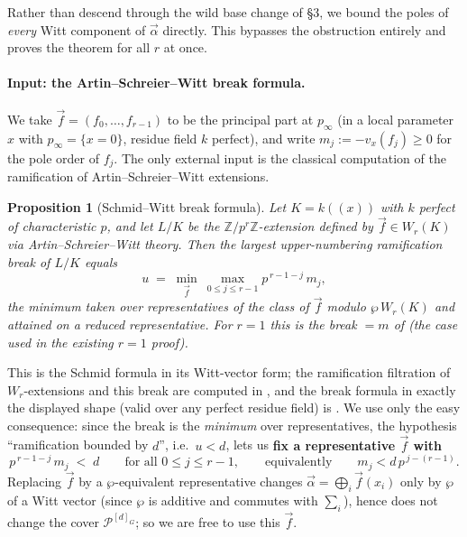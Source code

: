 \documentclass[11pt]{article}
\newcommand{\cP}{\mathcal{P}}
\newcommand{\Z}{\mathbb{Z}}
\newcommand{\AS}{\wp}
\theoremstyle{plain}
\newtheorem{prop}[theorem]{Proposition}
\theoremstyle{definition}
\providecommand{\AS}{\ensuremath{\wp}}
\begin{document}
Rather than descend through the wild base change of \S3, we bound the poles of \emph{every}
Witt component of $\vec\alpha$ directly. This bypasses the obstruction entirely and proves the
theorem for all $r$ at once.

\paragraph{Input: the Artin--Schreier--Witt break formula.}
We take $\vec f=(f_0,\dots,f_{r-1})$ to be the principal part at $p_\infty$ (in a local
parameter $x$ with $p_\infty=\{x=0\}$, residue field $k$ perfect), and write
$m_j:=-v_x(f_j)\ge 0$ for the pole order of $f_j$. The only external input is the classical
computation of the ramification of Artin--Schreier--Witt extensions.

\begin{prop}[Schmid--Witt break formula]\label{prop:schmid-witt}
Let $K=k((x))$ with $k$ perfect of characteristic $p$, and let $L/K$ be the
$\Z/p^r\Z$-extension defined by $\vec f\in W_r(K)$ via Artin--Schreier--Witt theory. Then the
largest upper-numbering ramification break of $L/K$ equals
\[
u \;=\; \min_{\vec f}\ \max_{0\le j\le r-1} p^{\,r-1-j}\,m_j ,
\]
the minimum taken over representatives of the class of $\vec f$ modulo $\AS\,W_r(K)$ and
attained on a reduced representative. For $r=1$ this is the break $=m$ of
\textnormal{\cite[Thm.]{Thomas2005}} (the case used in the existing $r=1$ proof).
\end{prop}

This is the Schmid formula \cite{Schmid1937} in its Witt-vector form; the ramification
filtration of $W_r$-extensions and this break are computed in \cite{Thomas2005}, and the
break formula in exactly the displayed shape (valid over any perfect residue field) is
\cite{ElderKeating2025}. We use only the easy consequence: since the break is the
\emph{minimum} over representatives, the hypothesis ``ramification bounded by $d$'', i.e.\
$u<d$, lets us \textbf{fix a representative $\vec f$ with}
\begin{equation}\label{eq:polebound}
p^{\,r-1-j}\,m_j \;<\; d \qquad\text{for all } 0\le j\le r-1,
\qquad\text{equivalently}\qquad m_j < d\,p^{\,j-(r-1)} .
\end{equation}
Replacing $\vec f$ by a $\AS$-equivalent representative changes $\vec\alpha=\bigoplus_i\vec f(x_i)$
only by $\AS$ of a Witt vector (since $\AS$ is additive and commutes with $\sum_i$), hence does
not change the cover $\cP^{[d]_G}$; so we are free to use this $\vec f$.
\end{document}
